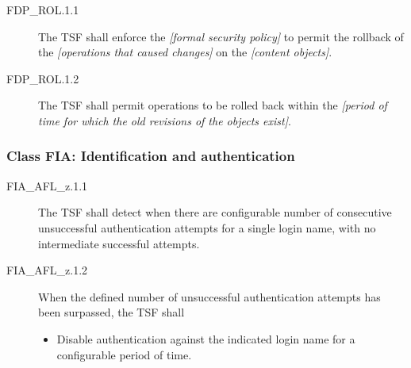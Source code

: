 \documentclass[12pt,english]{scrbook}
\begin{document}



\begin{description}
\item[FDP{\_}ROL.1.1 ]

The TSF shall enforce the \emph{{[}formal security policy]} to permit
the rollback of the \emph{{[}operations that caused changes]} on the \emph{{[}content
objects]}.

\item[FDP{\_}ROL.1.2 ]

The TSF shall permit operations to be rolled back
within the \emph{{[}period of time for which the old revisions of the objects
exist]}.

\end{description}





\subsubsection{Class FIA: Identification and authentication}





\begin{description}
\item[FIA{\_}AFL{\_}z.1.1]

The TSF shall detect when there are configurable number of consecutive
unsuccessful authentication attempts for a single login name,
with no intermediate successful attempts.

\item[FIA{\_}AFL{\_}z.1.2 ]

When the defined number of unsuccessful authentication attempts
has been surpassed, the TSF shall
\begin{itemize}
\item {} 
Disable authentication against the indicated login name for a
configurable period of time.

\end{itemize}

\end{description}
\end{document}
